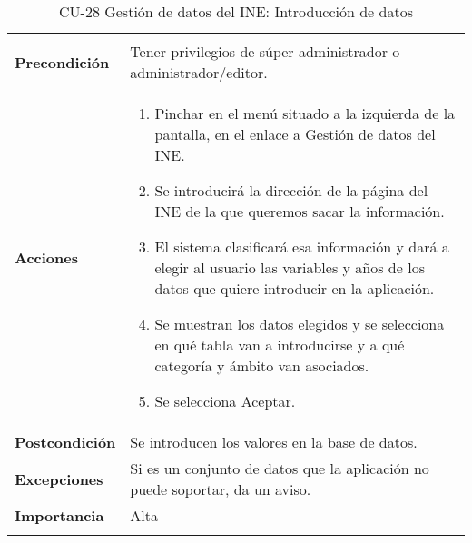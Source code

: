 \begin{longtable}[t]{@{}ll@{}}
\begin{minipage}[t]{0.71\columnwidth}
\strut
\end{minipage}\tabularnewline
\begin{minipage}[t]{0.23\columnwidth}\raggedright\strut
\textbf{Precondición}\strut
\end{minipage} & \begin{minipage}[t]{0.71\columnwidth}\raggedright\strut
Tener privilegios de súper administrador o administrador/editor.\strut
\end{minipage}\tabularnewline
\begin{minipage}[t]{0.23\columnwidth}\raggedright\strut
\textbf{Acciones}\strut
\end{minipage} & \begin{minipage}[t]{0.71\columnwidth}\raggedright\strut
\begin{enumerate}
\def\labelenumi{\arabic{enumi}.}
\tightlist
\item
Pinchar en el menú situado a la izquierda de la pantalla, en el
enlace a Gestión de datos del INE.
\item
Se introducirá la dirección de la página del INE de la que queremos sacar la información.
\item
El sistema clasificará esa información y dará a elegir al usuario las variables y años de los datos que quiere introducir en la aplicación.
\item
Se muestran los datos elegidos y se selecciona en qué tabla van a introducirse y a qué categoría y ámbito van asociados.
\item 
Se selecciona Aceptar.
\end{enumerate}\strut
\end{minipage}\tabularnewline
\begin{minipage}[t]{0.23\columnwidth}\raggedright\strut
\textbf{Postcondición}\strut
\end{minipage} & \begin{minipage}[t]{0.71\columnwidth}\raggedright\strut
Se introducen los valores en la base de datos.\strut
\end{minipage}\tabularnewline
\begin{minipage}[t]{0.23\columnwidth}\raggedright\strut
\textbf{Excepciones}\strut
\end{minipage} & \begin{minipage}[t]{0.71\columnwidth}\raggedright\strut
Si es un conjunto de datos que la aplicación no puede soportar, da un aviso. \strut
\end{minipage}\tabularnewline
\begin{minipage}[t]{0.23\columnwidth}\raggedright\strut
\textbf{Importancia}\strut
\end{minipage} & \begin{minipage}[t]{0.71\columnwidth}\raggedright\strut
Alta\strut
\end{minipage}\tabularnewline
\bottomrule
\caption{CU-28 Gestión de datos del INE: Introducción de datos}
\end{longtable}

